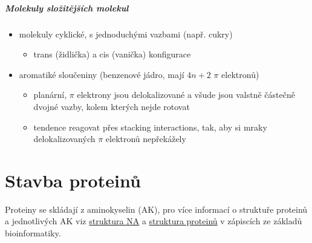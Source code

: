 \documentclass[DIV=8]{scrreprt}
\begin{document}
\paragraph{Molekuly složitějších molekul}
\begin{itemize}[nosep]
    \item molekuly cyklické, s jednoduchými vazbami (např. cukry)
\begin{itemize}[nosep]
    \item trans (židlička) a cis (vanička) konfigurace
\end{itemize}

    \item aromatiké sloučeniny (benzenové jádro, mají \(4n + 2\) \(\pi\) elektronů)
\begin{itemize}[nosep]
    \item planární, \(\pi\) elektrony jsou delokalizované a všude jsou valstně částečně dvojné vazby, kolem kterých nejde rotovat
    \item tendence reagovat přes stacking interactions, tak, aby si mraky delokalizovaných \(\pi\) elektronů nepřekážely
\end{itemize}

\end{itemize}



\chapter{Stavba proteinů} \label{Stavba proteinů}


Proteiny se skládají z aminokyselin (AK), pro více informací o struktuře proteinů a jednotlivých AK viz \href{/doc/zaklady-bioinformatiky/notes.html#Struktura nukleových kyselin}{struktura NA} a \href{/doc/zaklady-bioinformatiky/notes.html#Struktura proteinů}{struktura proteinů} v zápiscích ze základů bioinformatiky.
\end{document}
